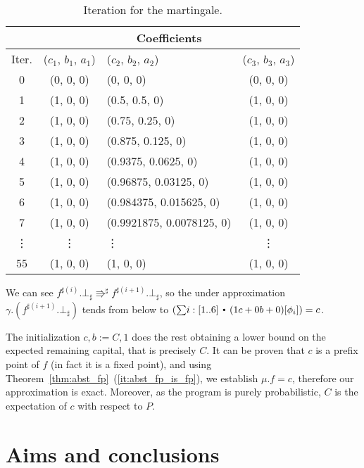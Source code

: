 \documentclass{eptcs}
\theoremstyle{plain}
\theoremstyle{definition}
\newcommand{\dotsep}{\mbox{\raisebox{0.4ex}{\tiny\ensuremath{\:\;\bullet\;\:}}}}
\newcommand{\aelq}{\ensuremath{\Rrightarrow^\sharp}}
\begin{document}
\begin{table}[!ht]
\begin{small}
\begin{center}
\begin{tabular}{|c||c|l|c|}
\hline
& \multicolumn{3}{|c|}{Coefficients} \\
\hline
Iter. & ($c_1$, $b_1$, $a_1$) & ($c_2$, $b_2$, $a_2$) & ($c_3$, $b_3$, $a_3$)  \\
\hline
0  &  (0, 0, 0) & (0, 0, 0) & (0, 0, 0) \\
1  &  (1, 0, 0) & (0.5, 0.5, 0) & (1, 0, 0) \\
2  &  (1, 0, 0) & (0.75, 0.25, 0) & (1, 0, 0) \\
3  &  (1, 0, 0) & (0.875, 0.125, 0) & (1, 0, 0) \\
4  &  (1, 0, 0) & (0.9375, 0.0625, 0) & (1, 0, 0) \\
5  &  (1, 0, 0) & (0.96875, 0.03125, 0) & (1, 0, 0) \\
6  &  (1, 0, 0) & (0.984375, 0.015625, 0) & (1, 0, 0) \\
7  &  (1, 0, 0) & (0.9921875, 0.0078125, 0) & (1, 0, 0) \\
\vdots & \vdots & \phantom{(1,}\hspace{0.9ex}\vdots & \vdots  \\
55  &  (1, 0, 0) & (1, 0, 0)  & (1, 0, 0) \\
\hline
\end{tabular}
\end{center}
\end{small}
\caption{Iteration for the martingale.}
\label{table:fp_martingale}
\end{table}





We can see $f^{\sharp (i)}.\bot_\sharp \aelq f^{\sharp (i+1)}.\bot_\sharp$, so the under approximation $\gamma.(f^{\sharp (i+1)}.\bot_\sharp)$ tends from below to $(\textstyle{\sum} i:[1..6] \dotsep (1c+0b+0)[\phi_i]) = c$.


The initialization $c,b:=C,1$ does the rest obtaining a lower bound on the expected remaining capital, that is precisely $C$.
It can be proven that $c$ is a prefix point of $f$ (in fact it is a fixed point),
and using Theorem~\ref{thm:abst_fp}~(\ref{it:abst_fp_is_fp}), we establish $\mu.f = c$, therefore our approximation is exact.
Moreover, as the program is purely probabilistic, $C$ is the expectation of $c$ with respect to $P$. 


\section{Aims and conclusions}\label{conclusions}
\end{document}
